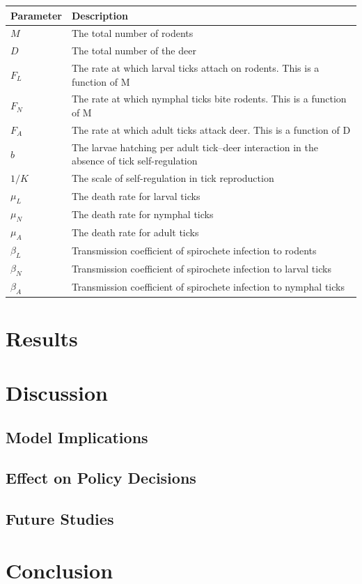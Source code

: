 \documentclass[12pt, centerh1]{article}
\begin{document}
\begin{table}[h!]
\centering
 \begin{tabular}{||l l||} 
 \hline
 Parameter & Description \\ [0.5ex] 
 \hline\hline
 $M$ & The total number of rodents\\ 
 $D$ & The total number of the deer\\
 $F_L$ & The rate at which larval ticks attach on rodents. This is a function of M\\
 $F_N$ & The rate at which nymphal ticks bite rodents. This is a function of M\\ 
 $F_A$ & The rate at which adult ticks attack deer. This is a function of D\\
 $b$ & The larvae hatching per adult tick–deer interaction in the absence
of tick self-regulation\\
 $1/K$ & The scale of self-regulation in tick reproduction\\
 $\mu_L$ & The death rate for larval ticks\\
 $\mu_N$ & The death rate for nymphal ticks\\
 $\mu_A$ & The death rate for adult ticks\\
 $\beta_L$ & Transmission coefficient of spirochete infection to rodents\\
 $\beta_N$ & Transmission coefficient of spirochete infection to larval ticks\\
 $\beta_A$ & Transmission coefficient of spirochete infection to nymphal ticks\\[1ex] 
 \hline
 \end{tabular}
\end{table}



\section{Results}



\section{Discussion}

\subsection{Model Implications}

\subsection{Effect on Policy Decisions}

\subsection{Future Studies}


\section{Conclusion}



\newpage

\end{document}
